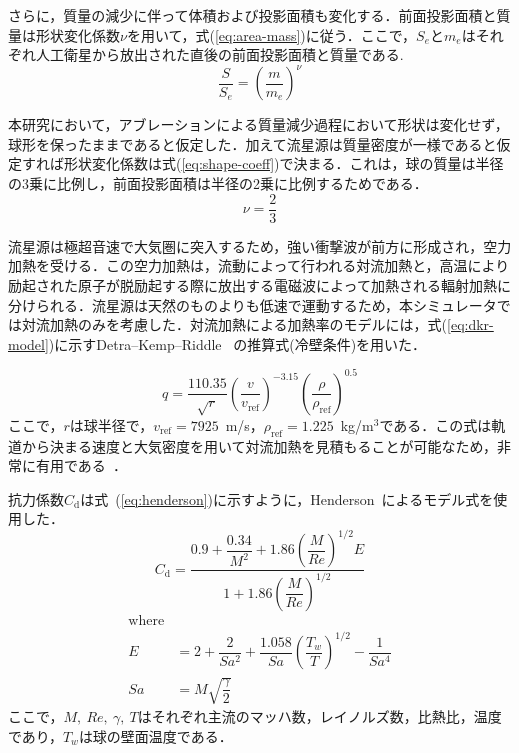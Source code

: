 \documentclass[a4paper,10pt]{jsarticle}
\begin{document}
\begin{multicols}{2}
さらに，質量の減少に伴って体積および投影面積も変化する．前面投影面積と質量は形状変化係数$\nu$を用いて，式(\ref{eq:area-mass})に従う．ここで，$S_e$と$m_e$はそれぞれ人工衛星から放出された直後の前面投影面積と質量である.
\begin{equation}
    \label{eq:area-mass}
    \dfrac{S}{S_e} = \left(\dfrac{m}{m_e}\right)^\nu
\end{equation}

本研究において，アブレーションによる質量減少過程において形状は変化せず，球形を保ったままであると仮定した．加えて流星源は質量密度が一様であると仮定すれば形状変化係数は式(\ref{eq:shape-coeff})で決まる．これは，球の質量は半径の3乗に比例し，前面投影面積は半径の2乗に比例するためである．
\begin{equation}
    \label{eq:shape-coeff}
    \nu = \dfrac23
\end{equation}

流星源は極超音速で大気圏に突入するため，強い衝撃波が前方に形成され，空力加熱を受ける．この空力加熱は，流動によって行われる対流加熱と，高温により励起された原子が脱励起する際に放出する電磁波によって加熱される輻射加熱に分けられる．流星源は天然のものよりも低速で運動するため，本シミュレータでは対流加熱のみを考慮した．対流加熱による加熱率のモデルには，式(\ref{eq:dkr-model})に示すDetra–Kemp–Riddle~\cite{dkr-model} の推算式(冷壁条件)を用いた．

\begin{equation}
    \label{eq:dkr-model}
	q= \dfrac{110.35}{\sqrt{r}} \left(\dfrac{v}{v_\mathrm{ref}}\right)^{-3.15}\left(\dfrac{\rho}{\rho_\mathrm{ref}}\right)^{0.5}
\end{equation}
ここで，$r$は球半径で，$v_\mathrm{ref} = 7925$~m/s，$\rho_\mathrm{ref} = 1.225$~kg/m$^3$である．この式は軌道から決まる速度と大気密度を用いて対流加熱を見積もることが可能なため，非常に有用である~\cite{nagoya-twins}．

抗力係数$C_\mathrm{d}$は式~(\ref{eq:henderson})に示すように，Henderson~\cite{henderson1976drag}によるモデル式を使用した．
\begin{equation}
    \label{eq:henderson}
    C_\mathrm{d} = \dfrac{0.9+\dfrac{0.34}{M^2}+1.86\left(\dfrac{M}{Re}\right)^{1/2}E}{1+1.86\left( \dfrac{M}{Re} \right)^{1/2}}
\end{equation}
\vspace{-0.7cm}
\begin{align*}
    \mathrm{where}& \\
    E &= 2+\dfrac2{Sa^2}+\dfrac{1.058}{Sa}\left(\dfrac{T_w}{T}\right)^{1/2}-\dfrac1{Sa^4} \\
    Sa &= M\sqrt{\dfrac{\gamma}{2}}
\end{align*}
ここで，$M,\ Re,\ \gamma,\ T$はそれぞれ主流のマッハ数，レイノルズ数，比熱比，温度であり，$T_w$は球の壁面温度である．


\end{multicols}
\end{document}

